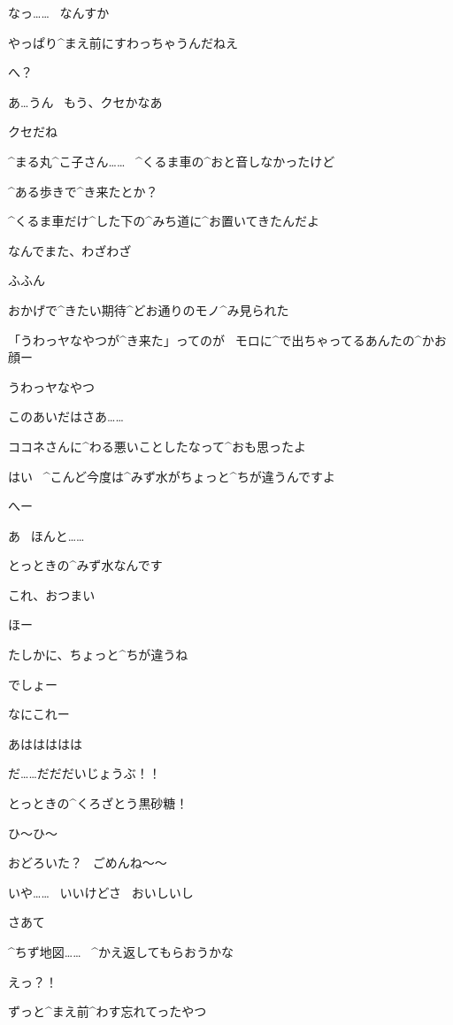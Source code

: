 \Alpha なっ……
\ なんすか

\Maruko やっぱり^{まえ}{前}にすわっちゃうんだねえ

\Alpha へ？

\Alpha あ…うん
\ もう、クセかなあ

\Maruko クセだね

\page[109]
\Alpha ^{まる}{丸}^{こ}{子}さん……
\ ^{くるま}{車}の^{おと}{音}しなかったけど

\Alpha ^{ある}{歩}きで^{き}{来}たとか？

\Maruko ^{くるま}{車}だけ^{した}{下}の^{みち}{道}に^{お}{置}いてきたんだよ

\Alpha なんでまた、わざわざ

\Maruko ふふん

\Maruko おかげで^{きたい}{期待}^{どお}{通}りのモノ^{み}{見}られた

\Maruko 「うわっヤなやつが^{き}{来}た」ってのが
\ モロに^{で}{出}ちゃってるあんたの^{かお}{顔}ー

\Alpha うわっヤなやつ

\page[110]
\Maruko このあいだはさあ……

\Maruko ココネさんに^{わる}{悪}いことしたなって^{おも}{思}ったよ

\page[111]
\Alpha はい
\ ^{こんど}{今度}は^{みず}{水}がちょっと^{ちが}{違}うんですよ

\Maruko へー

\Maruko あ
\ ほんと……

\Alpha とっときの^{みず}{水}なんです

\Alpha これ、おつまい

\Maruko ほー

\Maruko たしかに、ちょっと^{ちが}{違}うね

\Alpha でしょー

\page[112]
\Maruko なにこれー

\Alpha あははははは

\Alpha だ……だだだいじょうぶ！！

\Alpha とっときの^{くろざとう}{黒砂糖}！

\Alpha ひ〜ひ〜

\Alpha おどろいた？
\ ごめんね〜〜

\Maruko いや……
\ いいけどさ
\ おいしいし

\page[113]
\Maruko さあて

\Maruko ^{ちず}{地図}……
\ ^{かえ}{返}してもらおうかな

\Alpha えっ？！

\Maruko ずっと^{まえ}{前}^{わす}{忘}れてったやつ

